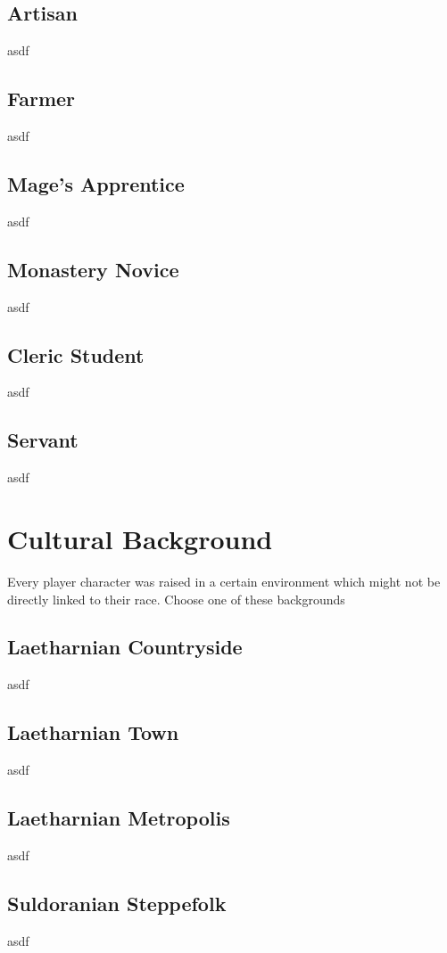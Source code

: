 \section{Artisan}
asdf

\section{Farmer}
asdf

\section{Mage's Apprentice}
asdf

\section{Monastery Novice}
asdf

\section{Cleric Student}
asdf

\section{Servant}
asdf


\chapter{Cultural Background}
Every player character was raised in a certain environment which might not be directly linked to their race. Choose one of these backgrounds\\

\section{Laetharnian Countryside}
asdf

\section{Laetharnian Town}
asdf

\section{Laetharnian Metropolis}
asdf

\section{Suldoranian Steppefolk}
asdf

